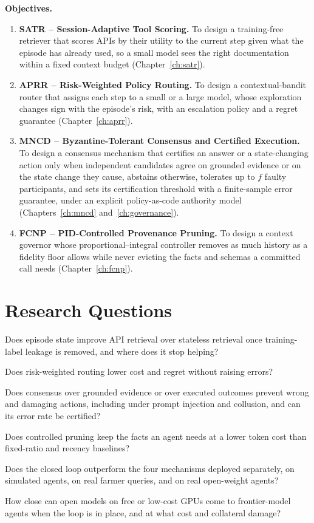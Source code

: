 \textbf{Objectives.}
\begin{enumerate}[label=\textbf{O\arabic*}, leftmargin=*]
\item \textbf{SATR -- Session-Adaptive Tool Scoring.} To design a training-free retriever that scores
APIs by their utility to the current step given what the episode has already used, so a small model
sees the right documentation within a fixed context budget (Chapter~\ref{ch:satr}).
\item \textbf{APRR -- Risk-Weighted Policy Routing.} To design a contextual-bandit router that assigns
each step to a small or a large model, whose exploration changes sign with the episode's risk, with an
escalation policy and a regret guarantee (Chapter~\ref{ch:aprr}).
\item \textbf{MNCD -- Byzantine-Tolerant Consensus and Certified Execution.} To design a consensus
mechanism that certifies an answer or a state-changing action only when independent candidates agree on
grounded evidence or on the state change they cause, abstains otherwise, tolerates up to $f$ faulty
participants, and sets its certification threshold with a finite-sample error guarantee, under an
explicit policy-as-code authority model (Chapters~\ref{ch:mncd} and~\ref{ch:governance}).
\item \textbf{FCNP -- PID-Controlled Provenance Pruning.} To design a context governor whose
proportional--integral controller removes as much history as a fidelity floor allows while never
evicting the facts and schemas a committed call needs (Chapter~\ref{ch:fcnp}).
\end{enumerate}

\section{Research Questions}
\label{sec:intro-rq}

\begin{description}[leftmargin=1.3cm, style=nextline]
\item[RQ1] Does episode state improve API retrieval over stateless retrieval once training-label leakage
is removed, and where does it stop helping?
\item[RQ2] Does risk-weighted routing lower cost and regret without raising errors?
\item[RQ3] Does consensus over grounded evidence or over executed outcomes prevent wrong and damaging
actions, including under prompt injection and collusion, and can its error rate be certified?
\item[RQ4] Does controlled pruning keep the facts an agent needs at a lower token cost than fixed-ratio
and recency baselines?
\item[RQ5] Does the closed loop outperform the four mechanisms deployed separately, on simulated agents,
on real farmer queries, and on real open-weight agents?
\item[RQ6] How close can open models on free or low-cost GPUs come to frontier-model agents when the loop
is in place, and at what cost and collateral damage?
\end{description}

